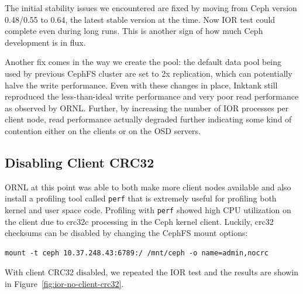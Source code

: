 \documentclass{article}
\begin{document}
The initial stability issues we encountered are fixed by moving 
from Ceph version 0.48/0.55 to 0.64, the latest stable version at the time. Now IOR test could
complete even during long runs. This is another sign of how much Ceph
development is in flux.

Another fix comes in the way we create the pool: the default data pool being used
by previous CephFS cluster are set to 2x replication, which can potentially
halve the write performance. Even with these changes in place, Inktank still
reproduced the less-than-ideal write performance and very poor read
performance as observed by ORNL.  Further, by increasing the number of IOR
processes per client node, read performance actually degraded further
indicating some kind of contention either on the clients or on the OSD
servers.


\subsection{Disabling Client CRC32}

ORNL at this point was able to both make more client nodes available and also
install a profiling tool called \verb!perf! that is extremely useful for
profiling both kernel and user space code.  Profiling with \verb!perf! showed
high CPU utilization on the client due to crc32c processing in the Ceph kernel
client.  Luckily, crc32 checksums can be disabled by changing the CephFS mount
options:

\begin{Verbatim}
mount -t ceph 10.37.248.43:6789:/ /mnt/ceph -o name=admin,nocrc
\end{Verbatim}


With client CRC32 disabled, we repeated the IOR test and the results are showin
in Figure~\ref{fig:ior-no-client-crc32}. 
\end{document}
